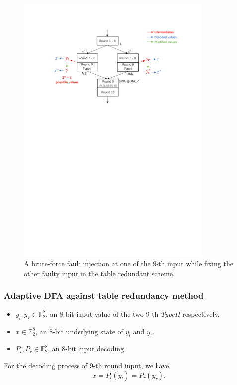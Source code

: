 \documentclass{beamer}
\begin{document}

\frame
{
	\begin{figure}
		\centering
		\includegraphics[width=9.5cm]{./pics/TRS3.pdf}
		\caption{A brute-force fault injection at one of the 9-th input while fixing the other faulty input in the table redundant scheme.}
	\end{figure}
}

\frame
{
	\frametitle{Adaptive DFA against table redundancy method}
	\begin{itemize}
		\item $y_{l}, y_{r} \in \mathbb{F}_{2}^{8}$, an 8-bit input value of the two 9-th \textit{TypeII} respectively.
		\item $x \in \mathbb{F}_{2}^{8}$, an 8-bit underlying state of $y_{l}$ and $y_{r}$.
		\item $P_{l}, P_{r} \in \mathbb{F}_{2}^{8}$, an 8-bit input decoding.
	\end{itemize}
	For the decoding process of 9-th round input, we have
	\[x = P_{l}(y_{l}) = P_{r}(y_{r}).\]
}
\end{document}
